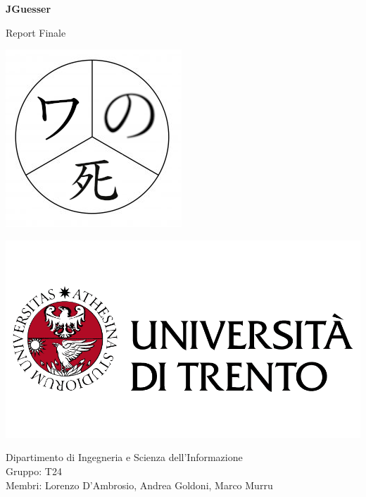 \documentclass[11pt]{article}
\begin{document}
\begin{titlepage}
		\begin{center}
		    \Huge
			\textbf{JGuesser}
			
			\LARGE
			\vspace{0.85cm}
			Report Finale\\
			\vspace{0.5cm}
			
			\includegraphics[scale=2.5]{images/logo_progetto_se-t24.png}
			
			\vfill
			
		    \includegraphics[scale=0.200]{images/logo_unitn.png}
			
			\Large
			Dipartimento di Ingegneria e Scienza dell’Informazione \\
			Gruppo: T24 \\
			Membri: Lorenzo D'Ambrosio, Andrea Goldoni, Marco Murru
				
			\vspace{1.5cm}
    		
		\end{center}
	\end{titlepage}

\tableofcontents






\end{document}
